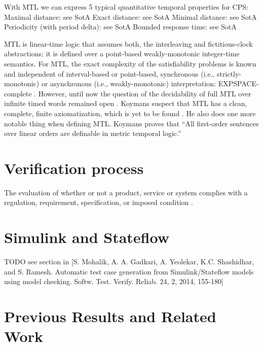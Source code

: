 With MTL we can express 5 typical quantitative temporal properties for CPS:
Maximal distance: see SotA
Exact distance: see SotA
Minimal distance: see SotA
Periodicity (with period delta): see SotA
Bounded response time: see SotA

MTL is linear-time logic that assumes both, the interleaving and fictitious-clock abstractions; it is defined over a point-based weakly-monotonic integer-time semantics. For MTL, the exact complexity of the satisfiability problems is known and independent of interval-based or point-based, synchronous (i.e., strictly-monotonic) or asynchronous (i.e., weakly-monotonic) interpretation: EXPSPACE-complete \cite{Rajeev:ModelsOfRealTime}. However, until now the question of the decidability of full MTL over infinite timed words remained open \cite{Ouaknine:MTLfaulty}. Koymans suspect that MTL has a clean, complete, finite axiomatization, which is yet to be found \cite{Koymans:MTL}. He also does one more notable thing when defining MTL. Koymans proves that “All first-order sentences over linear orders are definable in metric temporal logic.”

\section{Verification process}

The evaluation of whether or not a product, service or system complies with a regulation, requirement, specification, or imposed condition \cite{Boehm:SoftwareRiskManagement}.

\section{Simulink and Stateflow}

TODO see section in [S. Mohalik, A. A. Gadkari, A. Yeolekar, K.C. Shashidhar, and S. Ramesh. Automatic test case generation from Simulink/Stateflow models using model checking. Softw. Test. Verify. Reliab. 24, 2, 2014, 155-180]

\section{Previous Results and Related Work}
% 
